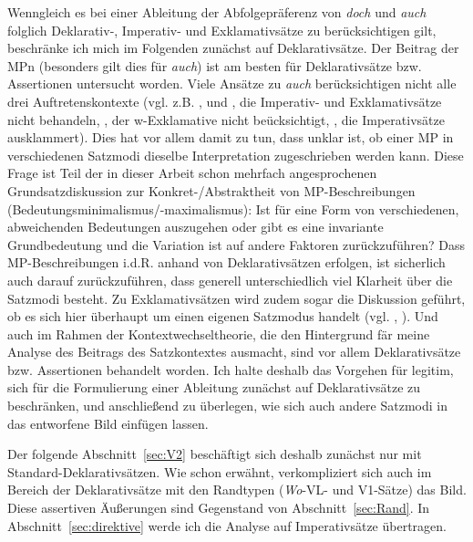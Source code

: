 {Wenngleich es bei einer Ableitung der Abfolgepräferenz von \textit{doch} und \textit{auch} folglich Deklarativ-, Imperativ- und Exklamativsätze zu berücksichtigen gilt, be\-schränke ich mich im Folgenden zunächst auf  Deklarativsätze. Der Beitrag der MPn (besonders gilt dies für \textit{auch}) ist am besten für Deklarativsätze bzw. Assertionen  untersucht worden. Viele Ansätze zu \textit{auch} berücksichtigen nicht alle drei Auftretenskontexte (vgl. z.B. \citealt{Franck1980}, \citealt[100-105]{Burkhardt1982} und \citealt{Ickler1994}, die Imperativ- und Exklamativsätze nicht behandeln, \citealt{Dahl1988}, der w-Exklamative nicht beücksichtigt, \citealt[222]{Karagjosova2004}, die Imperativsätze aus\-klammert). Dies hat vor allem damit zu tun, dass unklar ist, ob einer MP in verschiedenen Satzmodi dieselbe Interpretation zugeschrieben werden kann. Diese Frage ist Teil der in dieser Arbeit schon mehrfach angesprochenen Grundsatzdiskussion zur Konkret-/Abstraktheit von  MP-Beschreibungen (Bedeutungs\-minimalismus/-maximalismus): Ist für eine Form von verschiedenen, abweichenden Bedeutungen auszugehen oder gibt es eine invariante Grundbedeutung und die Variation ist auf andere Faktoren zurückzuführen? Dass MP-Beschreibungen i.d.R. anhand von Deklarativsätzen erfolgen, ist sicherlich auch darauf zurückzuführen, dass generell unterschiedlich viel Klarheit über die Satzmodi besteht. Zu Exklamativsätzen wird zudem sogar die Diskussion geführt, ob es sich hier überhaupt um einen eigenen Satzmodus  handelt (vgl. \citealt{Naef1987}, \citealt{Rosengren1992, Rosengren1997}). Und auch im Rahmen der  Kontextwechseltheorie, die den Hintergrund fär meine Analyse des Beitrags des Satzkontextes ausmacht, sind vor allem Deklarativsätze bzw. Assertionen behandelt worden. Ich halte deshalb das Vorgehen für legitim, sich für die Formulierung einer Ableitung zunächst auf Deklarativsätze zu beschränken, und anschließend zu überlegen, wie sich auch andere Satzmodi in das entworfene Bild einfügen lassen. 

Der folgende Abschnitt~\ref{sec:V2} beschäftigt sich deshalb zunächst nur mit Standard-Deklarativsätzen. Wie schon erwähnt, verkompliziert sich auch im Bereich der Deklarativsätze mit den Randtypen (\textit{Wo}-VL- und V1-Sätze) das Bild. Diese assertiven Äußerungen sind Gegenstand von Abschnitt~\ref{sec:Rand}. In Abschnitt~\ref{sec:direktive} werde ich die Analyse auf Imperativsätze übertragen. 

}
